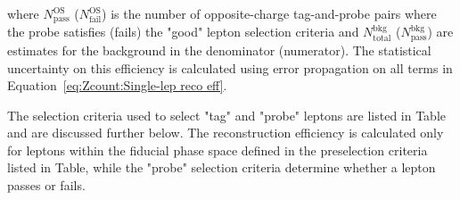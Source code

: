 where $N^\text{OS}_\text{pass}$ ($N^\text{OS}_\text{fail}$) is the number of opposite-charge tag-and-probe pairs where the probe satisfies (fails) the "good" lepton selection criteria and $N^\text{bkg}_\text{total}$ ($N^\text{bkg}_\text{pass}$) are estimates for the background in the denominator (numerator). The statistical uncertainty on this efficiency is calculated using error propagation on all terms in Equation~\ref{eq:Zcount:Single-lep reco eff}.

The selection criteria used to select "tag" and "probe" leptons are listed in Table and are discussed further below. The reconstruction efficiency is calculated only for leptons within the fiducial phase space defined in the preselection criteria listed in Table, while the "probe" selection criteria determine whether a lepton passes or fails.

